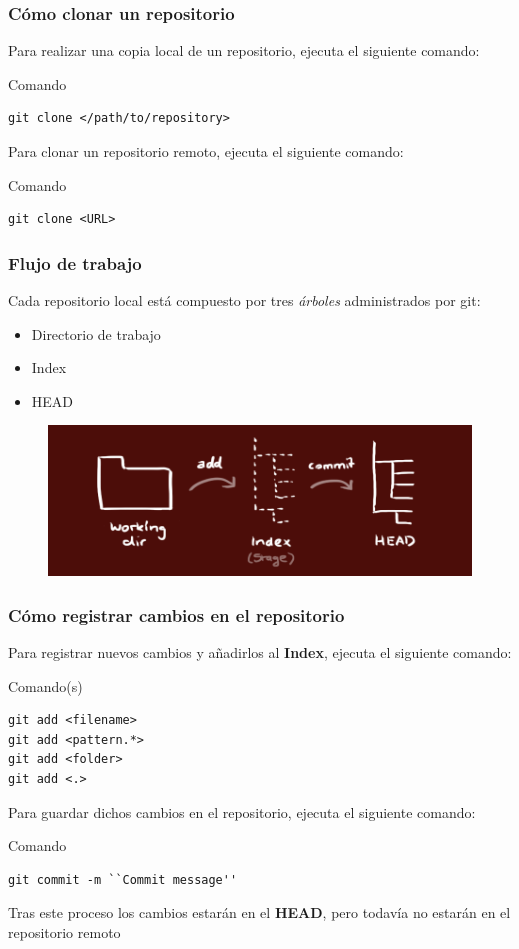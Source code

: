 \documentclass{beamer}
\begin{document}
\begin{frame}[fragile]
\frametitle{Cómo clonar un repositorio}
Para realizar una copia local de un repositorio, ejecuta el siguiente comando:
\begin{block}{Comando}
\begin{verbatim}
git clone </path/to/repository>
\end{verbatim}
\end{block}
\vskip 1.0cm
Para clonar un repositorio remoto, ejecuta el siguiente comando:
\begin{block}{Comando}
\begin{verbatim}
git clone <URL>
\end{verbatim}
\end{block}
\end{frame}

\begin{frame}
\frametitle{Flujo de trabajo}
Cada repositorio local está compuesto por tres \textit{árboles} administrados por git:
\begin{itemize}
\item Directorio de trabajo
\item Index
\item HEAD
\end{itemize}

\begin{figure}
\includegraphics[width=0.8\linewidth]{trees.png}
\end{figure}
\end{frame}

\begin{frame}[fragile]
\frametitle{Cómo registrar cambios en el repositorio}
Para registrar nuevos cambios y añadirlos al \textbf{Index}, ejecuta el siguiente comando:
\begin{block}{Comando(s)}
\begin{verbatim}
git add <filename>
git add <pattern.*>
git add <folder>
git add <.>
\end{verbatim}
\end{block}
\vskip 0.25cm
Para guardar dichos cambios en el repositorio, ejecuta el siguiente comando:
\begin{block}{Comando}
\begin{verbatim}
git commit -m ``Commit message''
\end{verbatim}
\end{block}
\vskip 0.25cm
Tras este proceso los cambios estarán en el \textbf{HEAD}, pero todavía no estarán en el repositorio remoto
\end{frame}
\end{document}
